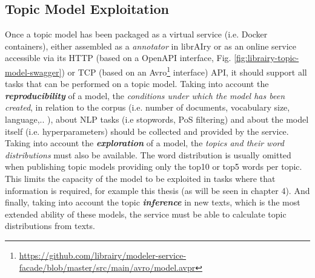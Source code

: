 \subsection{Topic Model Exploitation}
\label{sec:topic-model-exploitation}

Once a topic model has been packaged as a virtual service (i.e. Docker containers), either assembled as a \textit{annotator} in librAIry or as an online service accessible via its HTTP (based on a OpenAPI interface, Fig. \ref{fig:librairy-topic-model-swagger}) or TCP (based on an Avro\footnote{\url{https://github.com/librairy/modeler-service-facade/blob/master/src/main/avro/model.avpr}} interface) API, it should support all tasks that can be performed on a topic model. Taking into account the \textbf{\textit{reproducibility}} of a model, the \textit{conditions under which the model has been created}, in relation to the corpus (i.e. number of documents, vocabulary size, language,.. ), about NLP tasks (i.e stopwords, PoS filtering) and about the model itself (i.e. hyperparameters) should be collected and provided by the service. Taking into account the \textbf{\textit{exploration}} of a model, the \textit{topics and their word distributions} must also be available. The word distribution is usually omitted when publishing topic models providing only the top10 or top5 words per topic. This limits the capacity of the model to be exploited in tasks where that information is required, for example this thesis (as will be seen in chapter 4). And finally, taking into account the topic \textbf{\textit{inference}} in new texts, which is the most extended ability of these models, the service must be able to calculate topic distributions from texts.

